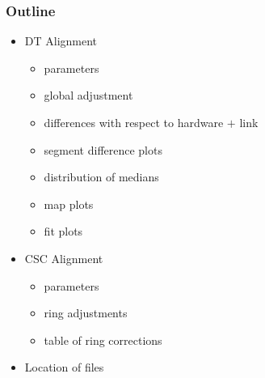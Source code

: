 \documentclass[compress]{beamer}
\begin{document}
\begin{frame}
\frametitle{Outline}
\begin{itemize}\setlength{\itemsep}{0.5 cm}
\item DT Alignment
\begin{itemize}
\item parameters
\item global adjustment
\item differences with respect to hardware $+$ link
\item segment difference plots
\item distribution of medians
\item map plots
\item fit plots
\end{itemize}

\item CSC Alignment
\begin{itemize}
\item parameters
\item ring adjustments
\item table of ring corrections
\end{itemize}

\item Location of files
\end{itemize}
\end{frame}
\end{document}
